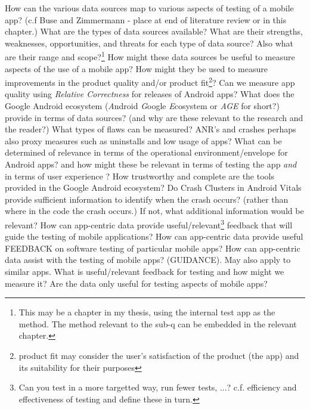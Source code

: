 \begin{outline}
  \1 How can the various data sources map to various aspects of testing of a mobile app? (c.f Buse and Zimmermann - place at end of literature review or in this chapter.)
    \2 What are the types of data sources available?
    \2 What are their strengths, weaknesses, opportunities, and threats for each type of data source? Also what are their range and scope?\footnote{This may be a chapter in my thesis, using the internal test app as the method. The method relevant to the sub-q can be embedded in the relevant chapter.}
      \3 How might these data sources be useful to measure aspects of the use of a mobile app? 
      \3 How might they be used to measure improvements in the product quality and/or product fit\footnote{product fit may consider the user's satisfaction of the product (the app) and its suitability for their purposes}?
        \4 Can we measure app quality using \textit{Relative Correctness} for releases of Android apps?
    \2 What does the Google Android ecosystem (\textit{A}ndroid \textit{G}oogle \textit{E}cosystem or \textit{AGE} for short?) provide in terms of data sources? (and why are these relevant to the research and the reader?)
      \3 What types of flaws can be measured? ANR's and crashes perhaps also proxy measures such as uninstalls and low usage of apps?
      \3 What can be determined of relevance in terms of the operational environment/envelope for Android apps? and how might these be relevant in terms of testing the app \textit{and} in terms of user experience ? 
      \3 How trustworthy and complete are the tools provided in the Google Android ecosystem?
        \4 Do Crash Clusters in Android Vitals provide sufficient information to identify when the crash occurs? (rather than where in the code the crash occurs.) If not, what additional information would be relevant?
    \1 How can app-centric data provide useful/relevant\footnote{Can you test in a more targetted way, run fewer tests, ...? c.f. efficiency and effectiveness of testing and define these in turn.} feedback that will guide the testing of mobile applications?
      \2 How can app-centric data provide useful FEEDBACK on software testing of particular mobile apps? 
      \2 How can app-centric data assist with the testing of mobile apps? (GUIDANCE). May also apply to similar apps. 
    \1 What is useful/relevant feedback for testing and how might we measure it?
  \1 Are the data only useful for testing aspects of mobile apps?
\end{outline}

